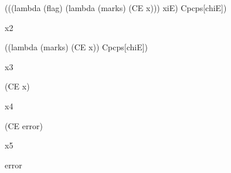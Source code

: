\begin{schemeblock}
\begin{schemedisplay}
(((lambda (flag)
    (lambda (marks)
      (CE x)))
  xiE) Cpcps[chiE])
\end{schemedisplay}
\end{schemeblock}

\noindent
x2

\begin{schemeblock}
\begin{schemedisplay}
((lambda (marks)
   (CE x))
 Cpcps[chiE])
\end{schemedisplay}
\end{schemeblock}

\noindent
x3

\begin{schemeblock}
\begin{schemedisplay}
(CE x)
\end{schemedisplay}
\end{schemeblock}

\noindent
x4

\begin{schemeblock}
\begin{schemedisplay}
(CE error)
\end{schemedisplay}
\end{schemeblock}

\noindent
x5

\begin{schemeblock}
\begin{schemedisplay}
error
\end{schemedisplay}
\end{schemeblock}

